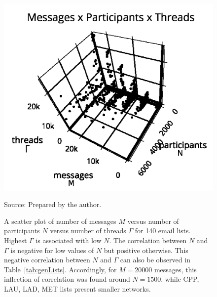 \begin{figure}
\centering
\caption{A scatter plot of number of messages $M$ versus number of participants $N$ versus number of threads $\Gamma$ for 140 email lists.
Highest $\Gamma$ is associated with low $N$.
The correlation between $N$ and $\Gamma$ is negative for low values of $N$ but positive otherwise.
This negative correlation between $N$ and $\Gamma$ can also be observed in Table~\ref{tab:genLists}.
Accordingly, for $M=20000$ messages, this inflection
of correlation was found around $N=1500$, while CPP, LAU, LAD, MET lists 
present smaller networks.}
\includegraphics[trim={0 0 0 1cm},clip,width=.7\columnwidth]{figs/mpgamma2_}
\begin{flushleft}
Source: Prepared by the author.\
\end{flushleft}
\label{fig:nmgamma3d}
\end{figure}



